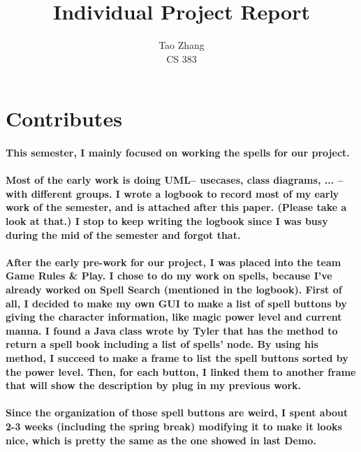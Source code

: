 \documentclass[12pt]{article}
\begin{document}
\title{Individual Project Report}

\author{Tao Zhang\\
CS 383}

\maketitle
\newpage


\section{Contributes}
\paragraph{This semester, I mainly focused on working the spells for our project.}

\paragraph{Most of the early work is doing UML-- usecases, class diagrams, ... -- with different groups. I wrote a logbook to record most of my early work of the semester, and is attached after this paper. (Please take a look at that.) I stop to keep writing the logbook since I was busy during the mid of the semester and forgot that. }

\paragraph{After the early pre-work for our project, I was placed into the team Game Rules \& Play. I chose to do my work on spells, because I've already worked on Spell Search (mentioned in the logbook). First of all, I decided to make my own GUI to make a list of spell buttons by giving the character information, like magic power level and current manna. I found a Java class wrote by Tyler that has the method to return a spell book including a list of spells' node. By using his method, I succeed to make a frame to list the spell buttons sorted by the power level. Then, for each button, I linked them to another frame that will show the description by plug in my previous work.}

\paragraph{Since the organization of those spell buttons are weird, I spent about 2-3 weeks (including the spring break) modifying it to make it looks nice, which is pretty the same as the one showed in last Demo.}
\end{document}
